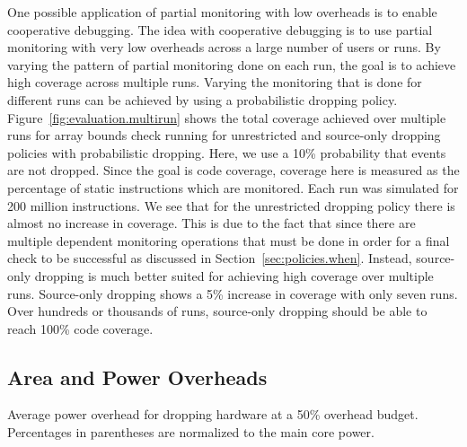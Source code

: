 One possible application of partial monitoring with low overheads is to enable
cooperative debugging. 
The idea with cooperative debugging is to use partial
monitoring with very low overheads across a large number of users or runs. By
varying the pattern of partial monitoring done on each run, the goal is to
achieve high coverage across multiple runs. Varying the monitoring that is
done for different runs can be achieved by using a probabilistic dropping policy.
Figure~\ref{fig:evaluation.multirun} shows the total
coverage achieved over multiple runs for array bounds check running for
unrestricted and source-only dropping policies with probabilistic dropping. Here, we use a 10\% probability
that events are not dropped. Since the goal is code coverage, coverage here is
measured as the percentage of static instructions which are monitored. Each run
was simulated for 200 million instructions. 
We see that for the unrestricted dropping policy there is almost no increase in
coverage.  This is due to the fact that since there are multiple dependent
monitoring operations that must be done in order for a final check to be
successful as discussed in Section~\ref{sec:policies.when}.
Instead, source-only
dropping is much better suited for achieving high coverage over multiple runs.
Source-only dropping shows a 5\% increase in coverage with only seven runs.
Over hundreds or thousands of runs, source-only dropping should be able to
reach 100\% code coverage.

\subsection{Area and Power Overheads}

\begin{table}[tb]
  \begin{center}
    \vspace{-0.0in}
    \begin{footnotesize}
    
    \end{footnotesize}
    \caption{Average power overhead for dropping hardware at a 50\% overhead
    budget. Percentages in parentheses are normalized to the main core
    power.}
    \vspace{-0.2in}
    \label{tab:evaluation.area_power}
  \end{center}
\end{table}

